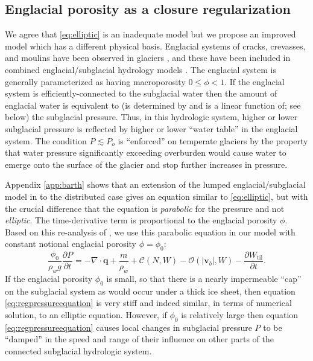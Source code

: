 \documentclass[11pt,final]{amsart}
\newcommand\bv{\mathbf{v}}
\newcommand\bq{\mathbf{q}}
\newcommand{\ddt}[1]{\ensuremath{\frac{\partial #1}{\partial t}}}
\newcommand{\Div}{\nabla\cdot}
\newcommand{\Wtil}{W_{\text{til}}}
\begin{document}
\subsection*{Englacial porosity as a closure regularization}  We agree that \eqref{eq:elliptic} is an inadequate model but we propose an improved model which has a different physical basis.  Englacial systems of cracks, crevasses, and moulins have been observed in glaciers \citep[for example]{Bartholomausetal2008,Harperetal2010}, and these have been included in combined englacial/subglacial hydrology models \citep[among others]{FlowersClarke2002_theory,Bartholomausetal2011,Hewitt2013}.  The englacial system is generally parameterized as having macroporosity $0\le \phi < 1$.  If the englacial system is efficiently-connected to the subglacial water then the amount of englacial water is equivalent to (is determined by and is a linear function of; see below) the subglacial pressure.  Thus, in this hydrologic system, higher or lower subglacial pressure is reflected by higher or lower ``water table'' in the englacial system.  The condition $P\lesssim P_o$ is ``enforced'' on temperate glaciers by the property that water pressure significantly exceeding overburden would cause water to emerge onto the surface of the glacier and stop further increases in pressure.

Appendix \ref{app:barth} shows that an extension of the lumped englacial/subglacial model in \cite{Bartholomausetal2011} to the distributed case gives an equation similar to \eqref{eq:elliptic}, but with the crucial difference that the equation is \emph{parabolic} for the pressure and not \emph{elliptic}.  The time-derivative term is proportional to the englacial porosity $\phi$.  Based on this re-analysis of \cite{Bartholomausetal2011}, we use this parabolic equation in our model with constant notional englacial porosity $\phi=\phi_0$:
\begin{equation}
\frac{\phi_0}{\rho_w g} \ddt{P} = - \Div \bq + \frac{m}{\rho_w} + \mathcal{C}(N,W) - \mathcal{O}(|\bv_b|,W) - \ddt{\Wtil}. \label{eq:regpressureequation}
\end{equation}
If the englacial porosity $\phi_0$ is small, so that there is a nearly impermeable ``cap'' on the subglacial system as would occur under a thick ice sheet, then equation \eqref{eq:regpressureequation} is very stiff and indeed similar, in terms of numerical solution, to an elliptic equation.  However, if $\phi_0$ is relatively large then equation \eqref{eq:regpressureequation} causes local changes in subglacial pressure $P$ to be ``damped'' in the speed and range of their influence on other parts of the connected subglacial hydrologic system.
\end{document}
